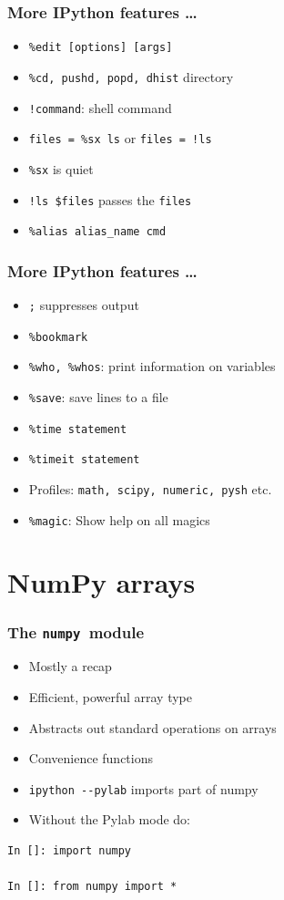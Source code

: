 \documentclass[14pt,compress]{beamer}
\newcounter{time}
\newcommand{\inctime}[1]{\addtocounter{time}{#1}{\tiny \thetime\ m}}
\newcommand{\typ}[1]{\lstinline{#1}}
\begin{document}
\begin{frame}[fragile]
  \frametitle{More IPython features \ldots}
  \begin{itemize}
  \item \verb+%edit [options] [args]+
  \item \verb+%cd, pushd, popd, dhist+ directory
    \item \verb+!command+: shell command
    \item \verb+files = %sx ls+ or \verb+files = !ls+
    \item \verb+%sx+ is quiet
    \item \verb+!ls $files+ passes the \verb+files+
    \item \verb+%alias alias_name cmd+
  \end{itemize}
\end{frame}

\begin{frame}[fragile]
  \frametitle{More IPython features \ldots}
  \begin{itemize}
  \item \verb+;+ suppresses output
  \item \verb+%bookmark+
  \item \verb+%who, %whos+: print information on variables
  \item \verb+%save+: save lines to a file
  \item \verb+%time statement+
  \item \verb+%timeit statement+
  \item Profiles: \verb+math, scipy, numeric, pysh+ etc.
  \item \verb+%magic+: \alert{Show help on all magics}
  \end{itemize}
  \inctime{15}
\end{frame}

\section{NumPy arrays}

\newcommand{\num}{\texttt{numpy}}


\begin{frame}[fragile]
  \frametitle{The \num\ module}
    \begin{itemize}
        \item \alert{Mostly a recap}
    \item Efficient, powerful array type
    \item Abstracts out standard operations on arrays
    \item Convenience functions
    \item \typ{ipython --pylab} imports part of numpy
    \item Without the Pylab mode do:
    \end{itemize}
    \begin{lstlisting}
In []: import numpy

In []: from numpy import *
    \end{lstlisting}
\end{frame}
\end{document}
